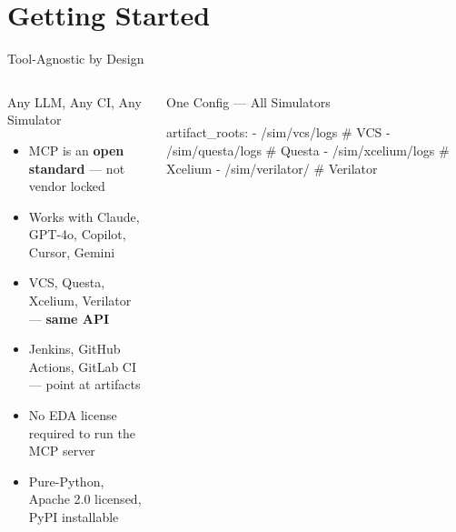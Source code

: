 \documentclass[aspectratio=169,t]{beamer}
\begin{document}
\section{Getting Started}

\begin{frame}[fragile]{Tool-Agnostic by Design}
  \begin{columns}[T]
      \begin{block}{Any LLM, Any CI, Any Simulator}
        \begin{itemize}
          \item MCP is an \textbf{open standard} — not vendor locked
          \item Works with Claude, GPT-4o, Copilot, Cursor, Gemini
          \item VCS, Questa, Xcelium, Verilator — \textbf{same API}
          \item Jenkins, GitHub Actions, GitLab CI — point at artifacts
          \item No EDA license required to run the MCP server
          \item Pure-Python, Apache 2.0 licensed, PyPI installable
        \end{itemize}
      \end{block}
      \vspace{0.4em}
      \begin{exampleblock}{One Config — All Simulators}
        \footnotesize
\begin{semiverbatim}\color{white}
artifact_roots:
  - /sim/vcs/logs       # VCS
  - /sim/questa/logs    # Questa
  - /sim/xcelium/logs   # Xcelium
  - /sim/verilator/     # Verilator
\end{semiverbatim}
      \end{exampleblock}


\end{columns}
\end{frame}
\end{document}
